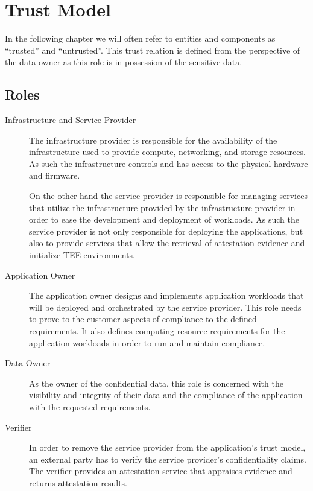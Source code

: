 \section{Trust Model}
\label{sec:trust-model}

In the following chapter we will often refer to entities and components as
``trusted'' and ``untrusted''. This trust relation is defined from the
perspective of the data owner as this role is in possession of the sensitive
data.

\subsection{Roles}

\begin{description}
  \item[Infrastructure and Service Provider]
    The infrastructure provider is responsible for the availability of the
    infrastructure used to provide compute, networking, and storage resources.
    As such the infrastructure controls and has access to the physical hardware
    and firmware.

    On the other hand the service provider is responsible for managing services
    that utilize the infrastructure provided by the infrastructure provider in
    order to ease the development and deployment of workloads. As such the
    service provider is not only responsible for deploying the applications, but
    also to provide services that allow the retrieval of attestation evidence
    and initialize TEE environments.

  \item[Application Owner]
    The application owner designs and implements application workloads that will
    be deployed and orchestrated by the service provider. This role needs to
    prove to the customer aspects of compliance to the defined requirements. It
    also defines computing resource requirements for the application workloads
    in order to run and maintain compliance.

  \item[Data Owner]
    As the owner of the confidential data, this role is concerned with the
    visibility and integrity of their data and the compliance of the application
    with the requested requirements.

  \item[Verifier]
    In order to remove the service provider from the application's trust model,
    an external party has to verify the service provider's confidentiality
    claims. The verifier provides an attestation service that appraises evidence
    and returns attestation results.
\end{description}

